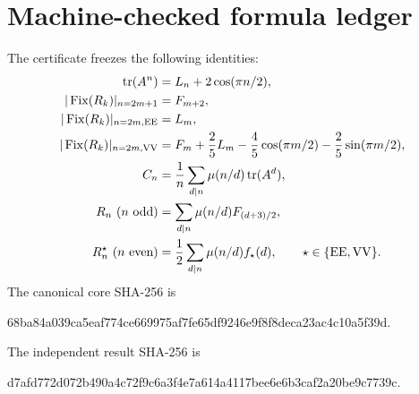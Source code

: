 \section{Machine-checked formula ledger}

The certificate freezes the following identities:
\begin{align*}
\operatorname{tr}(A^n)&=L_n+2\cos(\pi n/2),\\
|\operatorname{Fix}(R_k)|_{n=2m+1}&=F_{m+2},\\
|\operatorname{Fix}(R_k)|_{n=2m,\mathrm{EE}}&=L_m,\\
|\operatorname{Fix}(R_k)|_{n=2m,\mathrm{VV}}
 &=F_m+\frac25L_m-\frac45\cos(\pi m/2)
   -\frac25\sin(\pi m/2),\\
C_n&=\frac1n\sum_{d\mid n}\mu(n/d)\operatorname{tr}(A^d),\\
R_n\ (n\text{ odd})&=\sum_{d\mid n}\mu(n/d)F_{(d+3)/2},\\
R_n^\star\ (n\text{ even})
 &=\frac12\sum_{d\mid n}\mu(n/d)f_\star(d),
 \qquad \star\in\{\mathrm{EE},\mathrm{VV}\}.
\end{align*}
The canonical core SHA-256 is
\begin{center}
\ttfamily\small
68ba84a039ca5eaf774ce669975af7fe65df9246e9f8f8deca23ac4c10a5f39d.
\end{center}
The independent result SHA-256 is
\begin{center}
\ttfamily\small
d7afd772d072b490a4c72f9c6a3f4e7a614a4117bee6e6b3caf2a20be9c7739c.
\end{center}
